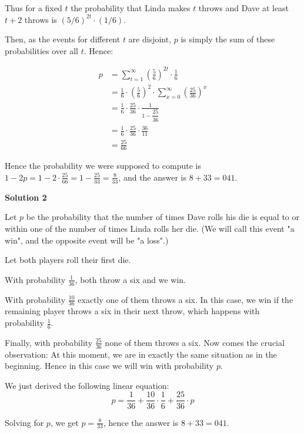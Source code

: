 \begin{enumerate}
 Thus for a fixed $t$ the probability that Linda makes $t$ throws and Dave at least $t+2$ throws is $(5/6)^{2t} \cdot (1/6)$.

 Then, as the events for different $t$ are disjoint, $p$ is simply the sum of these probabilities over all $t$. Hence:

 
 \begin{align*} p & = \sum_{t=1}^\infty \left(\frac 56\right)^{2t} \cdot \frac 16 \\ & = \frac 16 \cdot \left(\frac 56\right)^2 \cdot \sum_{x=0}^\infty \left(\frac{25}{36}\right)^x \\ & = \frac 16 \cdot \frac{25}{36} \cdot \frac 1{1 - \dfrac{25}{36}} \\ & = \frac 16 \cdot \frac{25}{36} \cdot \frac{36}{11} \\ & = \frac {25}{66} \end{align*}


 Hence the probability we were supposed to compute is $1 - 2p = 1 - 2\cdot \frac{25}{66} = 1 - \frac{25}{33} = \frac 8{33}$, and the answer is $8+33 = \boxed{041}$.

 



\textbf{Solution 2}

Let $p$ be the probability that the number of times Dave rolls his die is equal to or within one of the number of times Linda rolls her die. (We will call this event "a win", and the opposite event will be "a loss".)

 Let both players roll their first die. 

 With probability $\frac 1{36}$, both throw a six and we win.

 With probability $\frac{10}{36}$ exactly one of them throws a six. In this case, we win if the remaining player throws a six in their next throw, which happens with probability $\frac 16$.

 Finally, with probability $\frac{25}{36}$ none of them throws a six. Now comes the crucial observation: At this moment, we are in exactly the same situation as in the beginning. Hence in this case we will win with probability $p$.

 We just derived the following linear equation:
 \[p = \frac 1{36} + \frac{10}{36} \cdot \frac 16 + \frac{25}{36} \cdot p\]

 Solving for $p$, we get $p=\frac 8{33}$, hence the answer is $8+33 = \boxed{041}$.

 




\end{enumerate}
